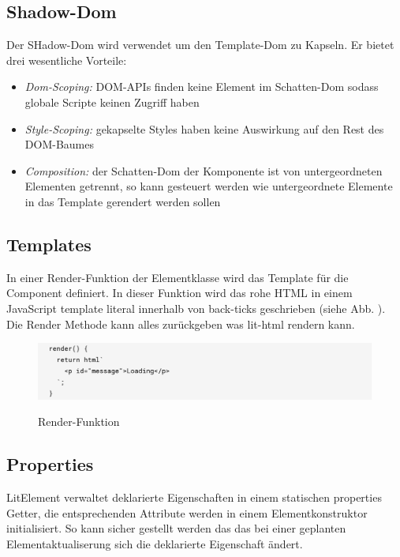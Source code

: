 \documentclass[12pt,					%
							 oneside,			%
							 a4paper,			%
							 halfparskip,		%
							 liststotoc,			%
							 bibtotoc,			%
							 fleqn,				%
							 pointlessnumbers]	%
							 {scrreprt}
\begin{document}
					\subsection{Shadow-Dom}
					Der SHadow-Dom wird verwendet um den Template-Dom zu Kapseln. Er bietet drei wesentliche Vorteile: 
					\begin{itemize}
						\item \textit{Dom-Scoping:} DOM-APIs finden keine Element im Schatten-Dom sodass globale Scripte keinen Zugriff haben
						\item \textit{Style-Scoping:} gekapselte Styles haben keine Auswirkung auf den Rest des DOM-Baumes
						\item \textit{Composition:} der Schatten-Dom der Komponente ist von untergeordneten Elementen getrennt, so kann gesteuert werden wie untergeordnete Elemente in das Template gerendert werden sollen\cite{webcom}
					\end{itemize}
					\subsection{Templates}
					In einer Render-Funktion der Elementklasse wird das Template für die Component definiert. In dieser Funktion wird das rohe HTML in einem JavaScript template literal innerhalb von back-ticks geschrieben (siehe Abb. ). Die Render Methode kann alles zurückgeben was lit-html rendern kann. \cite{litelem}
					\begin{figure}[h]
						\centering
						\includegraphics[width=1\textwidth]{pictures/render-function}
						\caption{Render-Funktion}\cite{litelem}
						\label{Render-Funktion}
					\end{figure}
				
					\subsection{Properties}
					LitElement verwaltet deklarierte Eigenschaften in einem statischen properties Getter, die entsprechenden Attribute werden in einem Elementkonstruktor initialisiert. So kann sicher gestellt werden das das bei einer geplanten Elementaktualiserung sich die deklarierte Eigenschaft ändert.  \cite{litelem}
		
\end{document}
